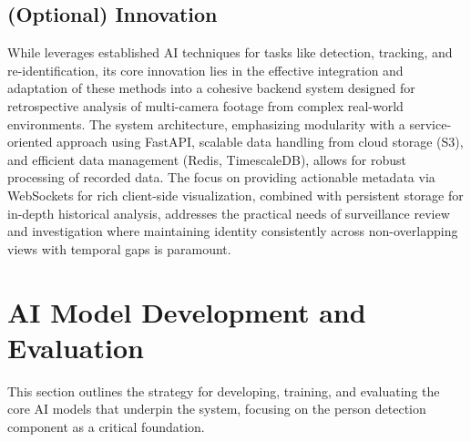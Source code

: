 \subsection{(Optional) Innovation}
\label{subsection:innovation_aic}
While \usevar{\srsTitle} leverages established AI techniques for tasks like detection, tracking, and re-identification, its core innovation lies in the effective integration and adaptation of these methods into a cohesive backend system designed for retrospective analysis of multi-camera footage from complex real-world environments. The system architecture, emphasizing modularity with a service-oriented approach using FastAPI, scalable data handling from cloud storage (S3), and efficient data management (Redis, TimescaleDB), allows for robust processing of recorded data. The focus on providing actionable metadata via WebSockets for rich client-side visualization, combined with persistent storage for in-depth historical analysis, addresses the practical needs of surveillance review and investigation where maintaining identity consistently across non-overlapping views with temporal gaps is paramount.

\section{AI Model Development and Evaluation}
\label{section:ai_model_dev_eval_new}
This section outlines the strategy for developing, training, and evaluating the core AI models that underpin the \usevar{\srsTitle} system, focusing on the person detection component as a critical foundation.


